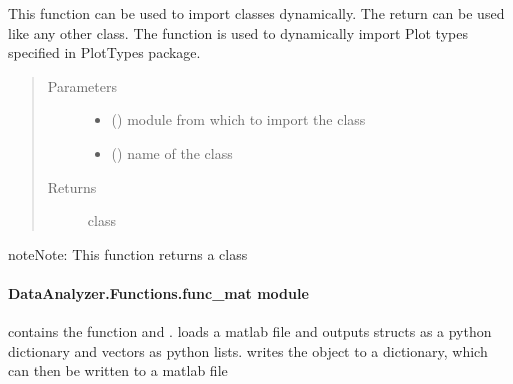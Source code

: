 \documentclass[letterpaper,10pt,english]{sphinxmanual}
\begin{document}
\begin{fulllineitems}
\label{\detokenize{DataAnalyzer.Functions:DataAnalyzer.Functions.func_import.dyn_import_cls}}
This function can be used to import classes dynamically.
The return can be used like any other class.
The function is used to dynamically import Plot types specified in PlotTypes package.
\begin{quote}\begin{description}
\item[{Parameters}] \leavevmode\begin{itemize}
\item {} 
 () \textendash{} module from which to import the class

\item {} 
 () \textendash{} name of the class

\end{itemize}

\item[{Returns}] \leavevmode
class

\end{description}\end{quote}

\begin{sphinxadmonition}{note}{Note:}
This function returns a class
\end{sphinxadmonition}

\end{fulllineitems}



\paragraph{DataAnalyzer.Functions.func\_mat module}
\label{\detokenize{DataAnalyzer.Functions:module-DataAnalyzer.Functions.func_mat}}\label{\detokenize{DataAnalyzer.Functions:dataanalyzer-functions-func-mat-module}}
 contains the function  and .
 loads a matlab file and outputs structs as a python dictionary and vectors as python lists.
 writes the  object to a dictionary, which can then be written to a matlab file
\end{document}
